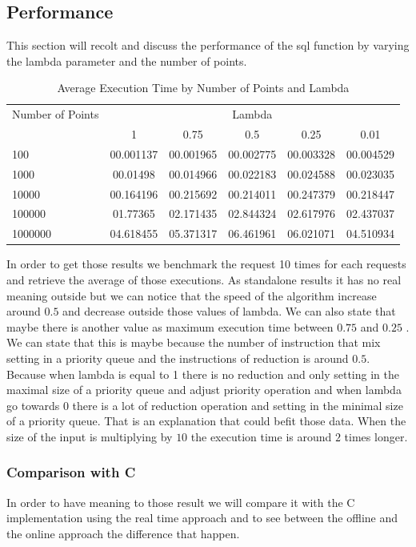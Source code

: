 \documentclass[twoside,12pt, a4paper]{report}
\begin{document}
\subsection{Performance}
This section will recolt and discuss the performance of the sql function by varying the lambda parameter and the number of points. 
\begin{table}[htbp]
	\centering
	\label{tab:execution_time}
	\begin{tabular}{@{}lccccc@{}}
		\toprule
		Number of Points & \multicolumn{5}{c}{Lambda} \\
		\cmidrule{2-6}
		& 1         & 0.75       & 0.5        & 0.25       & 0.01       \\
		\midrule
		100              & 00.001137 & 00.001965 & 00.002775 & 00.003328 & 00.004529 \\
		1000             & 00.01498  & 00.014966 & 00.022183 & 00.024588 & 00.023035 \\
		10000            & 00.164196 & 00.215692 & 00.214011 & 00.247379 & 00.218447 \\
		100000           & 01.77365  & 02.171435 & 02.844324 & 02.617976 & 02.437037 \\
		1000000          & 04.618455 & 05.371317 & 06.461961 & 06.021071 & 04.510934 \\
		\bottomrule
	\end{tabular}
    \caption{Average Execution Time by Number of Points and Lambda}
\end{table}

In order to get those results we benchmark the request 10 times for each requests and retrieve the average of those executions. As standalone results it has no real meaning outside but we can notice that the speed of the algorithm increase around $0.5$ and decrease outside those values of lambda. We can also state that maybe there is another value as maximum execution time between $0.75$ and $0.25$ . We can state that this is maybe because the number of instruction that mix setting in a priority queue and the instructions of reduction is around $0.5$. Because when lambda is equal to 1 there is no reduction and only setting in the maximal size of a priority queue and adjust priority operation and when lambda go towards $0$ there is a lot of reduction operation and setting in the minimal size of a priority queue. That is an explanation that could befit those data. When the size of the input is multiplying by $10$ the execution time is around $2$ times longer. 

\subsubsection{Comparison with C}
In order to have meaning to those result we will compare it with the C implementation using the real time approach and to see between the offline and the online approach the difference that happen.
\end{document}

